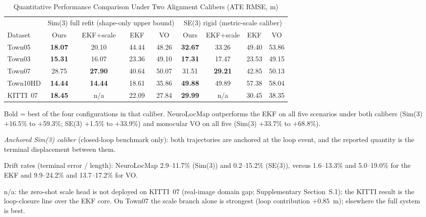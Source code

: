 \begin{table}[!t]
    \centering
    \setlength{\tabcolsep}{3pt}
    \footnotesize
    \caption{Quantitative Performance Comparison Under Two Alignment Calibers (ATE RMSE, m)}
    \label{tab:results}
    \begin{threeparttable}
        \footnotesize
        \setlength{\tabcolsep}{3.5pt}
        \begin{tabular}{@{}l cccc cccc@{}}
            \toprule
            & \multicolumn{4}{c}{Sim(3) full refit (shape-only upper bound)} & \multicolumn{4}{c}{SE(3) rigid (metric-scale caliber)} \\
            \cmidrule(lr){2-5} \cmidrule(lr){6-9}
            Dataset & Ours & EKF+scale & EKF & VO & Ours & EKF+scale & EKF & VO \\
            \midrule
            Town05   & \textbf{18.07} & 20.10 & 44.44 & 48.26 & \textbf{32.67} & 33.26 & 49.40 & 53.86 \\
            Town03   & \textbf{15.31} & 16.07 & 23.36 & 49.10 & \textbf{17.31} & 17.47 & 23.53 & 49.15 \\
            Town07   & 28.75 & \textbf{27.90} & 40.64 & 50.07 & 31.51 & \textbf{29.21} & 42.85 & 50.13 \\
            Town10HD & \textbf{14.44} & \textbf{14.44} & 18.61 & 35.86 & \textbf{49.88} & 49.89 & 57.38 & 58.04 \\
            KITTI~07 & \textbf{18.45} & n/a              & 22.09 & 27.84 & \textbf{29.99} & n/a              & 30.45 & 38.35 \\
            \bottomrule
        \end{tabular}
        \begin{tablenotes}
            \scriptsize
            \item Bold = best of the four configurations in that caliber. NeuroLocMap outperforms the EKF on all five scenarios under both calibers (Sim(3) $+$16.5\% to $+$59.3\%; SE(3) $+$1.5\% to $+$33.9\%) and monocular VO on all five (Sim(3) $+$33.7\% to $+$68.8\%).
            \item \emph{Anchored Sim(3) caliber} (closed-loop benchmark only): both trajectories are anchored at the loop event, and the reported quantity is the terminal displacement between them.
            \item Drift rates (terminal error / length): NeuroLocMap 2.9--11.7\% (Sim(3)) and 0.2--15.2\% (SE(3)), versus 1.6--13.3\% and 5.0--19.0\% for the EKF and 9.9--24.2\% and 13.7--17.2\% for VO.
            \item n/a: the zero-shot scale head is not deployed on KITTI~07 (real-image domain gap; Supplementary Section~S.1); the KITTI result is the loop-closure line over the EKF core. On Town07 the scale branch alone is strongest (loop contribution $+0.85$~m); elsewhere the full system is best.
        \end{tablenotes}
    \end{threeparttable}
\end{table}

